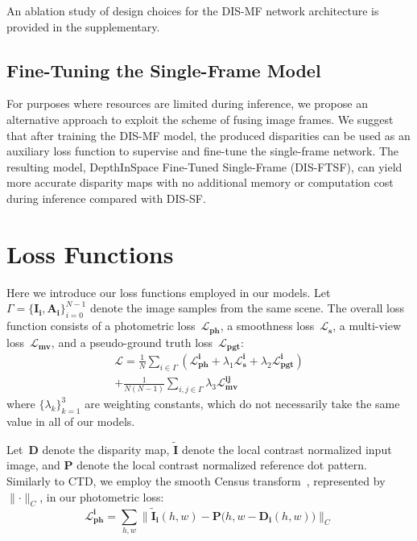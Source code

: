An ablation study of design choices for the DIS-MF network architecture is provided in the supplementary.

\subsection{Fine-Tuning the Single-Frame Model} \label{sec:c2_fine-tuned}

For purposes where resources are limited during inference, we propose an alternative approach to exploit the scheme of fusing image frames. We suggest that after training the DIS-MF model, the produced disparities can be used as an auxiliary loss function to supervise and fine-tune the single-frame network. The resulting model, DepthInSpace Fine-Tuned Single-Frame (DIS-FTSF), can yield more accurate disparity maps with no additional memory or computation cost during inference compared with DIS-SF.

\section{Loss Functions}\label{sec:c2_loss}

Here we introduce our loss functions employed in our models. Let $\Gamma=\{\boldsymbol{I_{i}}, \boldsymbol{A_{i}}\}_{i=0}^{N-1}$ denote the image samples from the same scene. The overall loss function consists of a photometric loss~$\boldsymbol{\mathcal{L}_{ph}}$, a smoothness loss~$\boldsymbol{\mathcal{L}_s}$, a multi-view loss~$\boldsymbol{\mathcal{L}_{mv}}$, and a pseudo-ground truth loss~$\boldsymbol{\mathcal{L}_{pgt}}$:
\begin{multline}
    \boldsymbol{\mathcal{L}} = \frac{1}{N}\sum_{i \in \Gamma} (\boldsymbol{\mathcal{L}^{i}_{ph}} + \lambda_{1}\boldsymbol{\mathcal{L}^{i}_{s}} + \lambda_{2}\boldsymbol{\mathcal{L}^{i}_{pgt}})\\
    + \frac{1}{N(N-1)}\sum_{i,j \in \Gamma} \lambda_{3}\boldsymbol{\mathcal{L}^{ij}_{mv}}
\end{multline}
where $\{\lambda_{k}\}_{k=1}^{3}$ are weighting constants, which do not necessarily take the same value in all of our models.

Let~$\boldsymbol{D}$ denote the disparity map, $\boldsymbol{\tilde{I}}$ denote the local contrast normalized input image, and $\boldsymbol{P}$ denote the local contrast normalized reference dot pattern. Similarly to CTD, we employ the smooth Census transform~\cite{hafner2013census}, represented by $\parallel \cdot \parallel_{C}$, in our photometric loss:
\begin{equation}\label{eqn:photometric}
    \boldsymbol{\mathcal{L}^{i}_{ph}}=\sum_{h,w} \parallel \boldsymbol{\tilde{I}_i}(h,w) - \boldsymbol{P}\big(h,w - \boldsymbol{D_{i}}(h,w)\big) \parallel_{C}
\end{equation}

